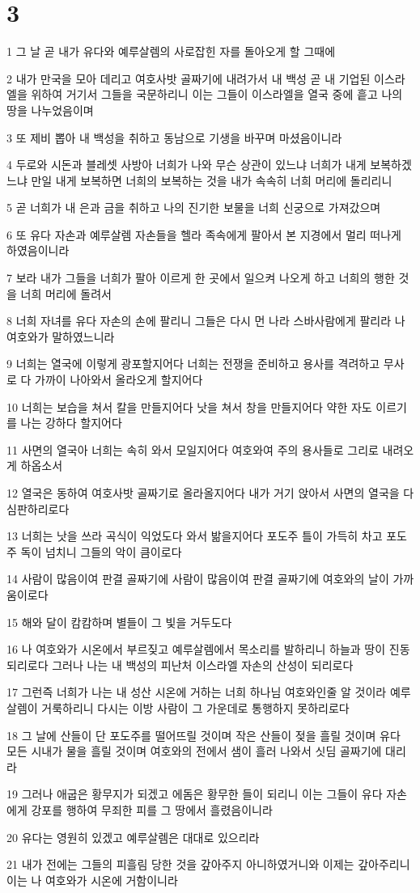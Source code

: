 \chapter{3}

\par 1 그 날 곧 내가 유다와 예루살렘의 사로잡힌 자를 돌아오게 할 그때에
\par 2 내가 만국을 모아 데리고 여호사밧 골짜기에 내려가서 내 백성 곧 내 기업된 이스라엘을 위하여 거기서 그들을 국문하리니 이는 그들이 이스라엘을 열국 중에 흩고 나의 땅을 나누었음이며
\par 3 또 제비 뽑아 내 백성을 취하고 동남으로 기생을 바꾸며 마셨음이니라
\par 4 두로와 시돈과 블레셋 사방아 너희가 나와 무슨 상관이 있느냐 너희가 내게 보복하겠느냐 만일 내게 보복하면 너희의 보복하는 것을 내가 속속히 너희 머리에 돌리리니
\par 5 곧 너희가 내 은과 금을 취하고 나의 진기한 보물을 너희 신궁으로 가져갔으며
\par 6 또 유다 자손과 예루살렘 자손들을 헬라 족속에게 팔아서 본 지경에서 멀리 떠나게 하였음이니라
\par 7 보라 내가 그들을 너희가 팔아 이르게 한 곳에서 일으켜 나오게 하고 너희의 행한 것을 너희 머리에 돌려서
\par 8 너희 자녀를 유다 자손의 손에 팔리니 그들은 다시 먼 나라 스바사람에게 팔리라 나 여호와가 말하였느니라
\par 9 너희는 열국에 이렇게 광포할지어다 너희는 전쟁을 준비하고 용사를 격려하고 무사로 다 가까이 나아와서 올라오게 할지어다
\par 10 너희는 보습을 쳐서 칼을 만들지어다 낫을 쳐서 창을 만들지어다 약한 자도 이르기를 나는 강하다 할지어다
\par 11 사면의 열국아 너희는 속히 와서 모일지어다 여호와여 주의 용사들로 그리로 내려오게 하옵소서
\par 12 열국은 동하여 여호사밧 골짜기로 올라올지어다 내가 거기 앉아서 사면의 열국을 다 심판하리로다
\par 13 너희는 낫을 쓰라 곡식이 익었도다 와서 밞을지어다 포도주 틀이 가득히 차고 포도주 독이 넘치니 그들의 악이 큼이로다
\par 14 사람이 많음이여 판결 골짜기에 사람이 많음이여 판결 골짜기에 여호와의 날이 가까움이로다
\par 15 해와 달이 캄캄하며 별들이 그 빛을 거두도다
\par 16 나 여호와가 시온에서 부르짖고 예루살렘에서 목소리를 발하리니 하늘과 땅이 진동되리로다 그러나 나는 내 백성의 피난처 이스라엘 자손의 산성이 되리로다
\par 17 그런즉 너희가 나는 내 성산 시온에 거하는 너희 하나님 여호와인줄 알 것이라 예루살렘이 거룩하리니 다시는 이방 사람이 그 가운데로 통행하지 못하리로다
\par 18 그 날에 산들이 단 포도주를 떨어뜨릴 것이며 작은 산들이 젖을 흘릴 것이며 유다 모든 시내가 물을 흘릴 것이며 여호와의 전에서 샘이 흘러 나와서 싯딤 골짜기에 대리라
\par 19 그러나 애굽은 황무지가 되겠고 에돔은 황무한 들이 되리니 이는 그들이 유다 자손에게 강포를 행하여 무죄한 피를 그 땅에서 흘렸음이니라
\par 20 유다는 영원히 있겠고 예루살렘은 대대로 있으리라
\par 21 내가 전에는 그들의 피흘림 당한 것을 갚아주지 아니하였거니와 이제는 갚아주리니 이는 나 여호와가 시온에 거함이니라


